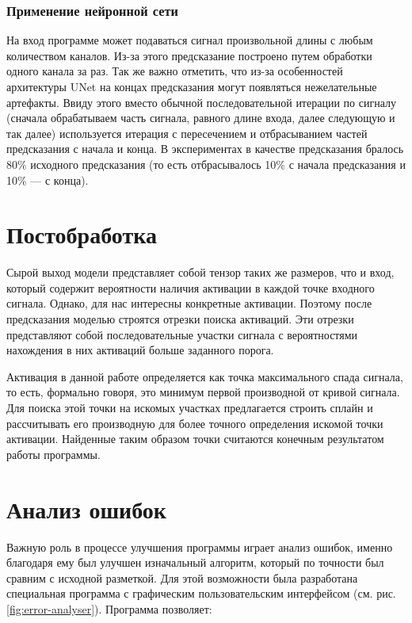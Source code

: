 \subsubsection{Применение нейронной сети}

На вход программе может подаваться сигнал произвольной длины с любым
количеством каналов. Из-за этого предсказание построено путем обработки одного
канала за раз. Так же важно отметить, что из-за особенностей архитектуры UNet
на концах предсказания могут появляться нежелательные артефакты. Ввиду этого
вместо обычной последовательной итерации по сигналу (сначала обрабатываем часть
сигнала, равного длине входа, далее следующую и так далее) используется
итерация с пересечением и отбрасыванием частей предсказания с начала и конца. В
экспериментах в качестве предсказания бралось 80\% исходного предсказания (то
есть отбрасывалось 10\% с начала предсказания и 10\% --- с конца).

\section{Постобработка}
Сырой выход модели представляет собой тензор таких же размеров, что и вход,
который содержит вероятности наличия активации в каждой точке входного сигнала.
Однако, для нас интересны конкретные активации. Поэтому после предсказания
моделью строятся отрезки поиска активаций. Эти отрезки представляют собой
последовательные участки сигнала с вероятностями нахождения в них активаций
больше заданного порога.

Активация в данной работе определяется как точка максимального спада сигнала,
то есть, формально говоря, это минимум первой производной от кривой сигнала.
Для поиска этой точки на искомых участках предлагается строить сплайн и
рассчитывать его производную для более точного определения искомой точки
активации. Найденные таким образом точки считаются конечным результатом работы
программы.

\section{Анализ ошибок}

Важную роль в процессе улучшения программы играет анализ ошибок, именно
благодаря ему был улучшен изначальный алгоритм, который по точности был сравним
с исходной разметкой. Для этой возможности была разработана специальная
программа с графическим пользовательским интерфейсом (см. рис.
\ref{fig:error-analyser}). Программа позволяет:

